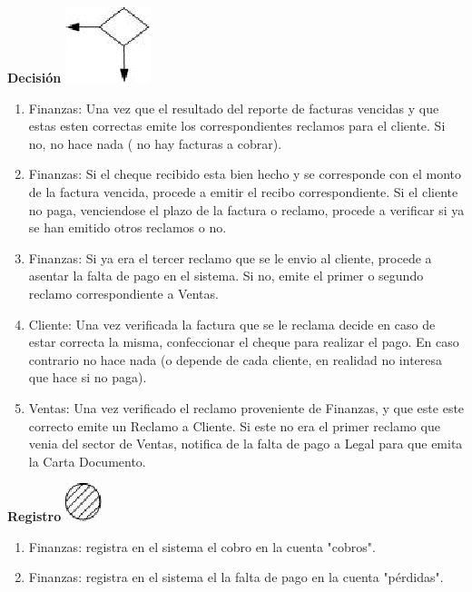 \begin{center}
  \textbf{Decisión}
  \includegraphics{./Images/Simbolos/simbolo-Decision.png}
\end{center}
\begin{enumerate}
\item Finanzas: Una vez que el resultado del reporte de facturas vencidas y que estas esten correctas emite los correspondientes reclamos para el cliente. Si no, no hace nada ( no hay facturas a cobrar).
\item Finanzas: Si el cheque recibido esta bien hecho y se corresponde con el monto de la factura vencida, procede a emitir el recibo correspondiente. Si el cliente no paga, venciendose el plazo de la factura o reclamo, procede a verificar si ya se han emitido otros reclamos o no.
\item Finanzas: Si ya era el tercer reclamo que se le envio al cliente, procede a asentar la falta de pago en el sistema. Si no, emite el primer o segundo reclamo correspondiente a Ventas.
\item Cliente: Una vez verificada la factura que se le reclama decide en caso de estar correcta la misma, confeccionar el cheque para realizar el pago. En caso contrario no hace nada (o depende de cada cliente, en realidad no interesa que hace si no paga).
\item Ventas: Una vez verificado el reclamo proveniente de Finanzas, y que este este correcto emite un Reclamo a Cliente. Si este no era el primer reclamo que venia del sector de Ventas, notifica de la falta de pago a Legal para que emita la Carta Documento.
\end{enumerate}

\begin{center}
  \textbf{Registro}
  \includegraphics{./Images/Simbolos/simbolo-Registro.png}
\end{center}
\begin{enumerate}
\item Finanzas: registra en el sistema el cobro en la cuenta "cobros".
\item Finanzas: registra en el sistema el la falta de pago en la cuenta "pérdidas".
\end{enumerate}

